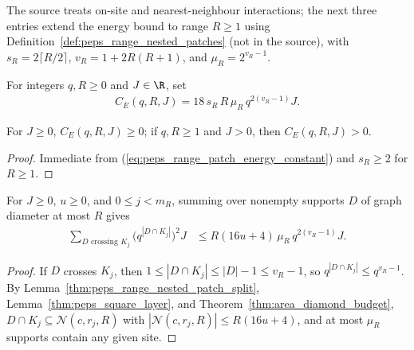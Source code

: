 The source treats on-site and nearest-neighbour interactions; the next three
entries extend the energy bound to range $R\ge1$ using Definition~\ref{def:peps_range_nested_patches} (not in the source), with $s_R=2\lceil R/2\rceil$, $v_R=1+2R(R+1)$, and $\mu_R=2^{v_R-1}$.

\begin{definition}
    \label{def:peps_range_patch_energy_constant}
    \leanok
    For integers $q,R\ge0$ and $J\in\R$, set
    \begin{align}
        C_E(q,R,J)=18\,s_R\,R\,\mu_R\,q^{2(v_R-1)}J.
        \label{eq:peps_range_patch_energy_constant}
    \end{align}
\end{definition}

\begin{lemma}
    \label{lem:peps_range_patch_energy_constant_sign}
    \leanok
    For $J\ge0$, $C_E(q,R,J)\ge0$; if $q,R\ge1$ and $J>0$, then $C_E(q,R,J)>0$.
\end{lemma}
\begin{proof}
    \leanok
    Immediate from (\ref{eq:peps_range_patch_energy_constant}) and $s_R\ge2$ for $R\ge1$.
\end{proof}

\begin{lemma}
    \label{lem:peps_range_patch_crossing_sum}
    \leanok
    For $J\ge0$, $u\ge0$, and $0\le j<m_R$, summing over nonempty supports $D$ of graph diameter at most $R$ gives
    \begin{align}
        \sum_{D\text{ crossing }K_j}\bigl(q^{|D\cap K_j|}\bigr)^2J
         & \le R(16u+4)\,\mu_R\,q^{2(v_R-1)}J.
        \label{eq:peps_range_patch_crossing_sum}
    \end{align}
\end{lemma}
\begin{proof}
    \leanok
    If $D$ crosses $K_j$, then $1\le|D\cap K_j|\le|D|-1\le v_R-1$, so $q^{|D\cap K_j|}\le q^{v_R-1}$. By Lemma~\ref{thm:peps_range_nested_patch_split}, Lemma~\ref{thm:peps_square_layer}, and Theorem~\ref{thm:area_diamond_budget}, $D\cap K_j\subseteq\mathcal N(c,r_j,R)$ with $|\mathcal N(c,r_j,R)|\le R(16u+4)$, and at most $\mu_R$ supports contain any given site.
\end{proof}

